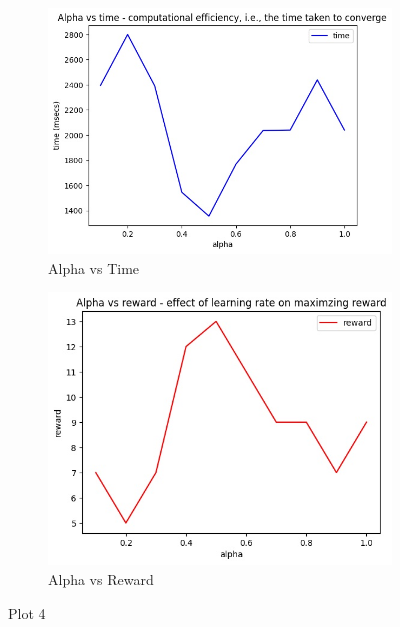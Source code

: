 \documentclass[conference]{IEEEtran}
\begin{document}
\newline
\begin{figure}[htbp]
  \centering
  \begin{subfigure}[t]{0.45\linewidth}
    \includegraphics[width=\linewidth]{Plots/alpha vs time 6.jpg}
    \caption{Alpha vs Time}
    \label{fig:figure90}
  \end{subfigure}
  \hfill
  \begin{subfigure}[t]{0.45\linewidth}
    \includegraphics[width=\linewidth]{Plots/alpha vs reward 6.jpg}
    \caption{Alpha vs Reward}
    \label{fig:figure91}
  \end{subfigure}
  \caption{Plot 4}
  \label{fig:bothfigures}
\end{figure}
\end{document}
